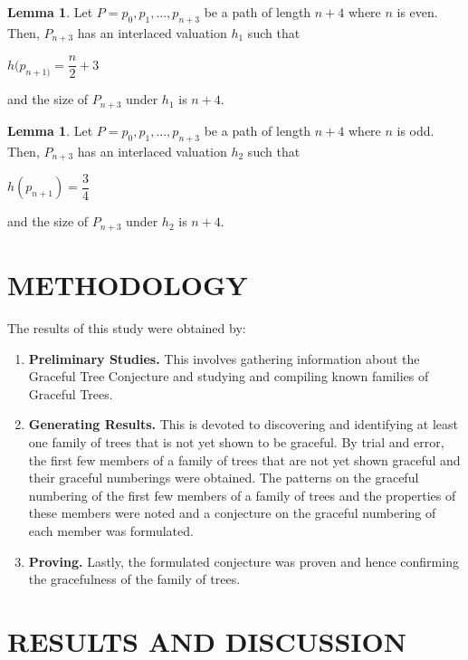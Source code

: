 \documentclass[12pt]{report}
\theoremstyle{definition}
\newtheorem{lem}[thm]{\indent Lemma}
\def\indent{\hspace*{.5cm}}
\begin{document}
\begin{lem}
    Let $P=p_{0},p_{1},\ldots,p_{n+3}$ be a path of length $n+4$ where $n$ is even. Then, $P_{n+3}$ has an interlaced valuation $h_{1}$ such that
    
    \begin{center}
        $h(p_{n+1)}=\dfrac{n}{2}+3$
    \end{center}
    
    \indent and the size of $P_{n+3}$ under $h_{1}$ is $n+4$.
\end{lem}

\begin{lem}
    Let $P=p_{0},p_{1},\ldots,p_{n+3}$ be a path of length $n+4$ where $n$ is odd. Then, $P_{n+3}$ has an interlaced valuation $h_{2}$ such that
    
    \begin{center}
        $h(p_{n+1})=\dfrac{3}{4}$
    \end{center}
    
    \indent and the size of $P_{n+3}$ under $h_{2}$ is $n+4$.
\end{lem}

\newpage
\chapter{METHODOLOGY}

\indent The results of this study were obtained by:
\begin{enumerate}
    \item \textbf{Preliminary Studies.} This involves gathering information about the Graceful Tree Conjecture and studying and compiling known families of Graceful Trees.
    \item \textbf{Generating Results.} This is devoted to discovering and identifying at least one family of trees that is not yet shown to be graceful. By trial and error, the ﬁrst few members of a family of trees that are not yet shown graceful and their graceful numberings were obtained. The patterns on the graceful numbering of the first few members of a family of trees and the properties of these members were noted and a conjecture on the graceful numbering of each member was formulated.
    \item \textbf{Proving.} Lastly, the formulated conjecture was proven and hence confirming the gracefulness of the family of trees. 

\end{enumerate}

\chapter{RESULTS AND DISCUSSION}
\end{document}
